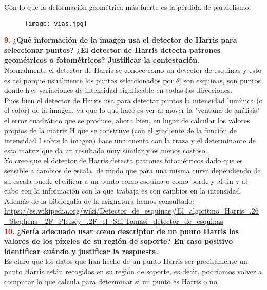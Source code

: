 \documentclass[10pt,a4paper]{article}
\begin{document}
Con lo que la deformación geométrica más fuerte es la pérdida de paralelismo.\\

\begin{figure}[H]
\centering
\texttt{[image: vias.jpg]}
\end{figure}


\textcolor{red}{\textbf{9.}} \textbf{¿Qué información de la imagen usa el detector de Harris para seleccionar puntos? ¿El detector de Harris detecta patrones geométricos o fotométricos? Justificar la contestación.}\\

Normalmente el detector de Harris se conoce como un detector de esquinas y esto es así porque usualmente los puntos seleccionados por él son esquinas, son puntos donde hay variaciones de intensidad significable en todas las direcciones.\\

Pues bien el detector de Harris usa para detectar puntos la intensidad lumínica (o el color) de la imagen, ya que lo que hace es ver al mover la "ventana de análisis" el error cuadrático que se produce, ahora bien, en lugar de calcular los valores propios de la matriz H que se construye (con el gradiente de la función de intensidad I sobre la imagen) hace una cuenta con la traza y el determinante de esta matriz que da un resultado muy similar y es menos costoso.\\

Yo creo que el detector de Harris detecta patrones fotométricos dado que es sensible a cambios de escala, de modo que para una misma curva dependiendo de su escala puede clasificar a un punto como esquina o como borde y al fin y al cabo con la información con la que trabaja es con cambios en la intensidad.\\

Además de la bibliogafía de la asignatura hemos consultado: \url{https://es.wikipedia.org/wiki/Detector_de_esquinas#El_algoritmo_Harris_.26_Stephens_.2F_Plessey_.2F_el_Shi-Tomasi_detector_de_esquinas}\\

\textcolor{red}{\textbf{10.}} \textbf{¿Sería adecuado usar como descriptor de un punto Harris los valores de los píxeles de su región de soporte? En caso positivo identificar cuándo y justificar la respuesta.}\\

Es claro que los datos que han hecho de un punto Harris ser precisamente un punto Harris están recogidos en su región de soporte, es decir, podríamos volver a computar lo que calcula para determinar si un punto es Harris o no.\\
\end{document}
